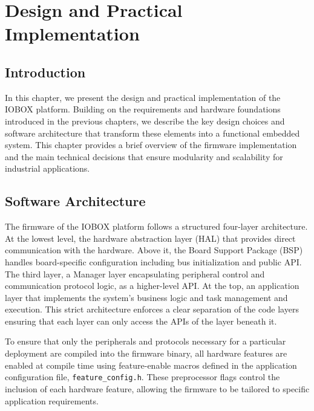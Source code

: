 \chapter{Design and Practical Implementation}

\pagestyle{fancy}
\fancyhf{}
\cfoot{\thepage}

\section{Introduction}

In this chapter, we present the design and practical implementation of the IOBOX platform. 
Building on the requirements and hardware foundations introduced in the previous chapters, we describe the key design choices and software architecture that transform these elements into a functional embedded system. 
This chapter provides a brief overview of the firmware implementation and the main technical decisions that ensure modularity and scalability for industrial applications.

\section{Software Architecture}

The firmware of the IOBOX platform follows a structured four-layer architecture. At the lowest level, the hardware abstraction layer (HAL) that provides direct communication with the hardware. Above it, the Board Support Package (BSP) handles board-specific configuration including bus initialization and public API. The third layer, a Manager layer encapsulating peripheral control and communication protocol logic, as a higher-level API. At the top, an application layer that implements the system's business logic and task management and execution. This strict architecture enforces a clear separation of the code layers ensuring that each layer can only access the APIs of the layer beneath it.
 
To ensure that only the peripherals and protocols necessary for a particular deployment are compiled into the firmware binary, all hardware features are enabled at compile time using feature-enable macros defined in the application configuration file, \texttt{feature\_config.h}. These preprocessor flags control the inclusion of each hardware feature, allowing the firmware to be tailored to specific application requirements.

